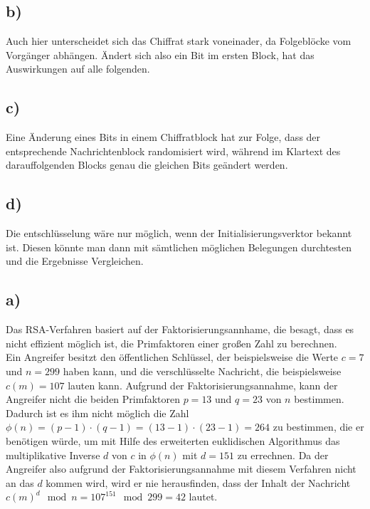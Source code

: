 \documentclass[ngerman]{fbi-aufgabenblatt}
\begin{document}
	\subsection*{b)}
	Auch hier unterscheidet sich das Chiffrat stark voneinader, da Folgeblöcke vom Vorgänger abhängen. Ändert sich also ein Bit im ersten Block, hat das Auswirkungen auf alle folgenden.
	
	\subsection*{c)}
	Eine Änderung eines Bits in einem Chiffratblock hat zur Folge, dass der entsprechende Nachrichtenblock randomisiert wird, während im Klartext des darauffolgenden Blocks genau die gleichen Bits geändert werden.

	\subsection*{d)}
	Die entschlüsselung wäre nur möglich, wenn der Initialisierungsverktor bekannt ist. Diesen könnte man dann mit sämtlichen möglichen Belegungen durchtesten und die Ergebnisse Vergleichen.
	
	
	
	
	\subsection*{a)}
	
	Das RSA-Verfahren basiert auf der Faktorisierungsannhame, die besagt, dass es nicht effizient möglich ist, die Primfaktoren einer großen Zahl zu berechnen. \\
	Ein Angreifer besitzt den öffentlichen Schlüssel, der beispielsweise die Werte $c=7$ und $n=299$ haben kann, und die verschlüsselte Nachricht, die beispielsweise $c(m)=107$ lauten kann. Aufgrund der Faktorisierungsannahme, kann der Angreifer nicht die beiden Primfaktoren $p=13$ und $q=23$ von $n$ bestimmen. Dadurch ist es ihm nicht möglich die Zahl $\phi(n)=(p-1)\cdot(q-1)=(13-1)\cdot(23-1)=264$ zu bestimmen, die er benötigen würde, um mit Hilfe des erweiterten euklidischen Algorithmus das multiplikative Inverse $d$ von $c$ in $\phi(n)$ mit $d=151$ zu errechnen. Da der Angreifer also aufgrund der Faktorisierungsannahme mit diesem Verfahren nicht an das $d$ kommen wird, wird er nie herausfinden, dass der Inhalt der Nachricht $c(m)^d \mod n = 107^{151} \mod 299 = 42$ lautet.
	
\end{document}
